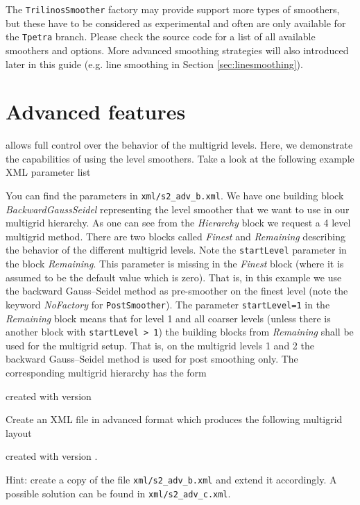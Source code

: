 \documentclass[10pt,fleqn]{book}
\newcommand\printScreenOutput[1]{

{\vspace{-0.3cm}\hfill\tiny{created with \muelu version }}
}
\begin{document}
The \texttt{TrilinosSmoother} factory may provide support more types of smoothers, but these have to be considered as experimental and often are only available for the \texttt{Tpetra} branch. Please check the source code for a list of all available smoothers and options. More advanced smoothing strategies will also introduced later in this guide (e.g. line smoothing in Section \ref{sec:linesmoothing}).

\section{Advanced features}
\muelu allows full control over the behavior of the multigrid levels. Here, we demonstrate the capabilities of \muelu using the level smoothers.
Take a look at the following example XML parameter list


You can find the parameters in \texttt{xml/s2\_adv\_b.xml}. We have one building block \textit{BackwardGaussSeidel} representing the level smoother that we want to use in our multigrid hierarchy. As one can see from the \textit{Hierarchy} block we request a 4 level multigrid method. There are two blocks called \textit{Finest} and \textit{Remaining} describing the behavior of the different multigrid levels. Note the \texttt{startLevel} parameter in the block \textit{Remaining}. This parameter is missing in the \textit{Finest} block (where it is assumed to be the default value which is zero). That is, in this example we use the backward Gauss--Seidel method as pre-smoother on the finest level (note the keyword \textit{NoFactory} for \texttt{PostSmoother}). The parameter \texttt{startLevel=1} in the \textit{Remaining} block means that for level 1 and all coarser levels (unless there is another block with \texttt{startLevel > 1}) the building blocks from \textit{Remaining} shall be used for the multigrid setup.
That is, on the multigrid levels 1 and 2 the backward Gauss--Seidel method is used for post smoothing only. The corresponding multigrid hierarchy has the form
\printScreenOutput{s2_adv_b.txt_3.fragment_3.fragment}

\begin{exercise}
  Create an XML file in advanced format which produces the following multigrid layout
  \printScreenOutput{s2_adv_c.txt_3.fragment_3.fragment}.

  Hint: create a copy of the file \texttt{xml/s2\_adv\_b.xml} and extend it accordingly. A possible solution can be found in \texttt{xml/s2\_adv\_c.xml}.
\end{exercise}
\end{document}
